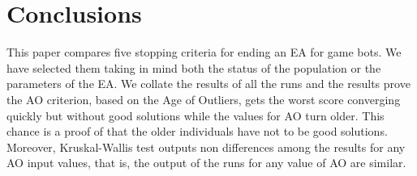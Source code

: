 \documentclass[runningheads,a4paper]{llncs}
\begin{document}
\section{Conclusions}




This paper compares five stopping criteria for ending an EA for game bots. We have selected them taking in mind both the status of the population or the parameters of the EA. We collate the results of all the runs and the results prove the AO criterion, based on the Age of Outliers, gets the worst score converging quickly but without good solutions while the values for AO turn older. This chance is a proof of that the older individuals have not to be good solutions. Moreover, Kruskal-Wallis test outputs non differences among the results for any AO input values, that is, the output of the runs for any value of AO are similar.  


\end{document}
